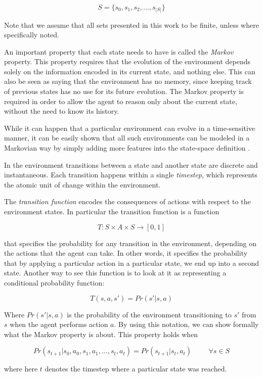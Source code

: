 \[ S = \{s_0, s_1, s_2, ..., s_{|S|}\} \]

Note that we assume that all sets presented in this work to be finite, unless where specifically
noted.

An important property that each state needs to have is called the \textit{Markov} property. This
property requires that the evolution of the environment depends solely on the information encoded in
its current state, and nothing else. This can also be seen as saying that the environment has no
memory, since keeping track of previous states has no use for its future evolution. The Markov
property is required in order to allow the agent to reason only about the current state, without the
need to know its history.

While it can happen that a particular environment can evolve in a time-sensitive manner, it can be
easily shown that all such environments can be modeled in a Markovian way by simply adding more
features into the state-space definition \cite{cit:boutilier}.

In the environment transitions between a state and another state are discrete and instantaneous.
Each transition happens within a single \textit{timestep}, which represents the atomic unit of
change within the environment.

The \textit{transition function} encodes the consequences of actions with respect to the environment
states. In particular the transition function is a function

\[ T: S\times A \times S \rightarrow [0,1] \]

that specifies the probability for any transition in the environment, depending on the actions that
the agent can take. In other words, it specifies the probability that by applying a particular
action in a particular state, we end up into a second state. Another way to see this
function is to look at it as representing a conditional probability function:

\[ T(s, a, s') = Pr(s' | s, a) \]

Where $Pr(s'|s,a)$ is the probability of the environment transitioning to $s'$ from $s$ when the
agent performs action $a$. By using this notation, we can show formally what the Markov property is
about. This property holds when

\[ Pr(s_{t+1} | s_{0}, a_{0}, s_{1}, a_{1}, ..., s_{t}, a_{t} ) = Pr(s_{t+1} | s_t, a_t ) \hspace{1cm} \forall s \in S \]

where here $t$ denotes the timestep where a particular state was reached.

